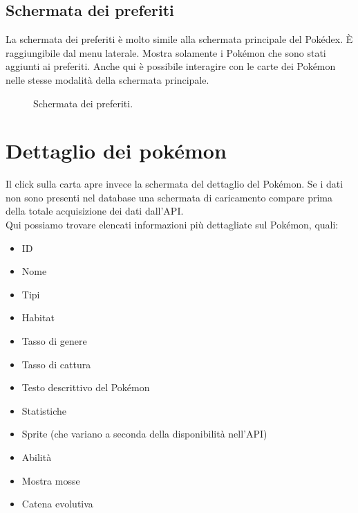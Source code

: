 \documentclass[a4paper,11pt]{article}
\begin{document}
\subsection{Schermata dei preferiti}
La schermata dei preferiti è molto simile alla schermata principale del Pokédex. È raggiungibile dal menu laterale. Mostra solamente i Pokémon che sono stati aggiunti ai preferiti. Anche qui è possibile interagire con le carte dei Pokémon nelle stesse modalità della schermata principale.
  \begin{figure}[h!]
    \centering
{}
  \caption{Schermata dei preferiti.}
\end{figure}
\newpage

\section{Dettaglio dei pokémon}
  Il click sulla carta apre invece la schermata del dettaglio del Pokémon. Se i dati non sono presenti nel database una schermata di caricamento compare prima della totale acquisizione dei dati dall'API.
  \\Qui possiamo trovare elencati informazioni più dettagliate sul Pokémon, quali:
\begin{itemize}
\item ID
\item Nome
\item Tipi
\item Habitat
\item Tasso di genere
\item Tasso di cattura
\item Testo descrittivo del Pokémon
\item Statistiche
\item Sprite (che variano a seconda della disponibilità nell’API)
\item Abilità
\item Mostra mosse
\item Catena evolutiva
\end{itemize}
\end{document}
